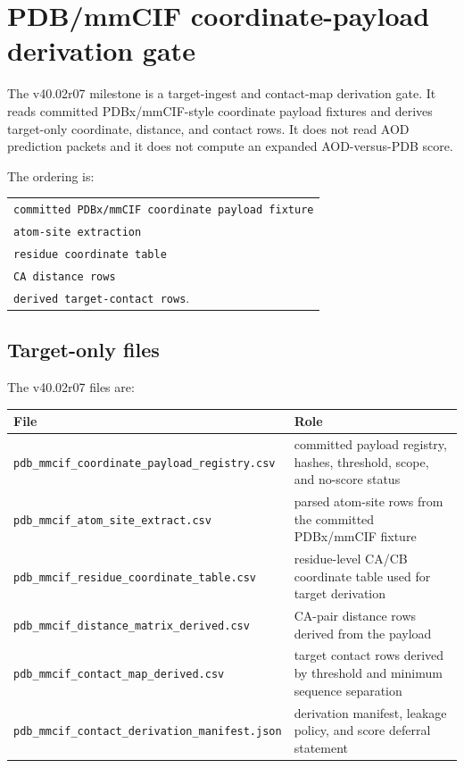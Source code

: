 \section{PDB/mmCIF coordinate-payload derivation gate}

The v40.02r07 milestone is a target-ingest and contact-map derivation gate. It reads committed PDBx/mmCIF-style coordinate payload fixtures and derives target-only coordinate, distance, and contact rows. It does not read AOD prediction packets and it does not compute an expanded AOD-versus-PDB score.

The ordering is:
\begin{center}
\begin{tabularx}{\linewidth}{@{}X@{}}
\texttt{committed PDBx/mmCIF coordinate payload fixture} \\
\textrightarrow{} \texttt{atom-site extraction} \\
\textrightarrow{} \texttt{residue coordinate table} \\
\textrightarrow{} \texttt{CA distance rows} \\
\textrightarrow{} \texttt{derived target-contact rows}. 
\end{tabularx}
\end{center}

\subsection{Target-only files}

The v40.02r07 files are:
\begin{center}
\begin{tabularx}{\linewidth}{@{}lX@{}}
\toprule
File & Role \\
\midrule
\texttt{pdb\_mmcif\_coordinate\_payload\_registry.csv} & committed payload registry, hashes, threshold, scope, and no-score status \\
\texttt{pdb\_mmcif\_atom\_site\_extract.csv} & parsed atom-site rows from the committed PDBx/mmCIF fixture \\
\texttt{pdb\_mmcif\_residue\_coordinate\_table.csv} & residue-level CA/CB coordinate table used for target derivation \\
\texttt{pdb\_mmcif\_distance\_matrix\_derived.csv} & CA-pair distance rows derived from the payload \\
\texttt{pdb\_mmcif\_contact\_map\_derived.csv} & target contact rows derived by threshold and minimum sequence separation \\
\texttt{pdb\_mmcif\_contact\_derivation\_manifest.json} & derivation manifest, leakage policy, and score deferral statement \\
\bottomrule
\end{tabularx}
\end{center}

